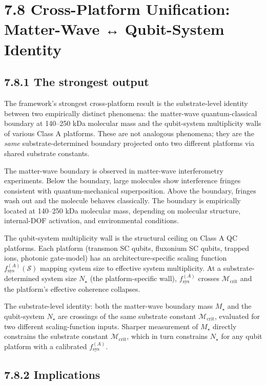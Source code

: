 \documentclass[11pt]{book}
\begin{document}
\section{7.8 Cross-Platform Unification: Matter-Wave ↔ Qubit-System Identity}

\subsection{7.8.1 The strongest output}

The framework's strongest cross-platform result is the substrate-level identity between two empirically distinct phenomena: the matter-wave quantum-classical boundary at 140–250 kDa molecular mass and the qubit-system multiplicity walls of various Class A platforms. These are not analogous phenomena; they are the \textit{same} substrate-determined boundary projected onto two different platforms via shared substrate constants.

The matter-wave boundary is observed in matter-wave interferometry experiments. Below the boundary, large molecules show interference fringes consistent with quantum-mechanical superposition. Above the boundary, fringes wash out and the molecule behaves classically. The boundary is empirically located at 140–250 kDa molecular mass, depending on molecular structure, internal-DOF activation, and environmental conditions.

The qubit-system multiplicity wall is the structural ceiling on Class A QC platforms. Each platform (transmon SC qubits, fluxonium SC qubits, trapped ions, photonic gate-model) has an architecture-specific scaling function $f_\mathrm{sys}^{(A)}(\mathcal{S})$ mapping system size to effective system multiplicity. At a substrate-determined system size $N_\star$ (the platform-specific wall), $f_\mathrm{sys}^{(A)}$ crosses $\mathcal{M}_\mathrm{crit}$ and the platform's effective coherence collapses.

The substrate-level identity: both the matter-wave boundary mass $M_\star$ and the qubit-system $N_\star$ are crossings of the same substrate constant $\mathcal{M}_\mathrm{crit}$, evaluated for two different scaling-function inputs. Sharper measurement of $M_\star$ directly constrains the substrate constant $\mathcal{M}_\mathrm{crit}$, which in turn constrains $N_\star$ for any qubit platform with a calibrated $f_\mathrm{sys}^{(A)}$.

\subsection{7.8.2 Implications}
\end{document}
